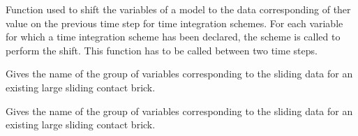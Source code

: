 \documentclass[a4paper,11pt,english]{sphinxmanual}
\begin{document}
\begin{fulllineitems}
\begin{fulllineitems}
\end{fulllineitems}


\begin{fulllineitems}
\label{\detokenize{python/cmdref_Model:getfem.Model.shift_variables_for_time_integration}}
Function used to shift the variables of a model to the data
corresponding of ther value on the previous time step for time
integration schemes. For each variable for which a time integration
scheme has been declared, the scheme is called to perform the shift.
This function has to be called between two time steps.

\end{fulllineitems}


\begin{fulllineitems}
\label{\detokenize{python/cmdref_Model:getfem.Model.sliding_data_group_name_of_Nitsche_large_sliding_contact_brick}}
Gives the name of the group of variables corresponding to the
sliding data for an existing large sliding contact brick.

\end{fulllineitems}


\begin{fulllineitems}
\label{\detokenize{python/cmdref_Model:getfem.Model.sliding_data_group_name_of_large_sliding_contact_brick}}
Gives the name of the group of variables corresponding to the
sliding data for an existing large sliding contact brick.

\end{fulllineitems}


\end{fulllineitems}
\end{document}
